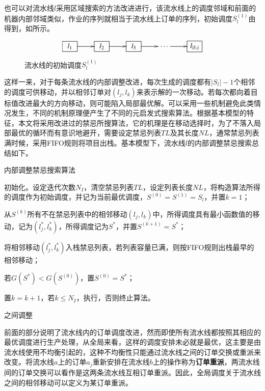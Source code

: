 \begin{asparaenum}
也可以对流水线$l$采用区域搜索的方法改进进行，该流水线上的调度邻域和前面的机器内部邻域类似，作业的序列就相当于流水线上订单的序列，初始调度$S_l^{(1)}$由得到，如所示。
\begin{figure}[h]
\begin{equation*}
\xymatrix{
\jobunit{l_1} \ar[r] & \jobunit{l_2} \ar[r]& \jobunit{l_3} \ar[r]&\cdots\ar[r] &\jobunit{l_{|S_l|}}
}
\end{equation*}
\caption{流水线的初始调度$S_l^{(1)}$\label{fig:initlschedule}}
\end{figure}
这样一来，对于每条流水线的内部调整改进，每次生成的调度都有$|S_l|-1$个相邻的调度可供移动，并以相邻订单对$(l_j, l_k)$来表示解的一次移动。若每次都向着目标值改进最大的方向移动，则可能陷入局部最优解。可以采用一些机制避免此类情况发生，不同的机制原理便产生了不同的元启发式搜索算法。根据基本模型的特征，本文将采用改进过的禁忌所搜算法，它的机理是在移动选择时，为了不落入局部最优的循环而有意识地避开，需要设定禁忌列表$TL$及其长度$NL$，通常禁忌列表满时候，采用FIFO规则将项目出栈。基本模型下，流水线$l$的内部调整禁忌搜索总结如下。
\begin{algori}
内部调整禁忌搜索算法
\begin{asparaenum}
\renewcommand{\labelenumi}{\bf Step\theenumi~}
\item 初始化。设定迭代次数$N_I$，清空禁忌列表$TL$，设定列表长度$NL$，将构造算法所得的调度作为初始调度，并记为当前最优调度，$S^{(0)} = S^{(1)} = S_l$，并置$k = 1$；
\item 从$S^{(k)}$所有不在禁忌列表中的相邻移动$(l_j,l_k)$中，所得调度具有最小函数值的移动，记为$(l_j^*, l_k^*)$，所得调度记为$S^*$，并置$S^{(k+1)} = S^*$；
\item 将相邻移动$(l_j^*, l_k^*)$入栈禁忌列表，若列表容量已满，则按FIFO规则出栈最早的相邻移动；
\item 若$G(S^*) < G(S^{(0)})$，置$S^{(0)} = S^*$；
\item 置$k = k + 1$，若$k\le N_I$，执行，否则终止算法。
\end{asparaenum}
\label{alg:intertabu}
\end{algori}

\item 之间调整

前面的部分说明了流水线内的订单调度改进，然而即使所有流水线都按照其相应的最优调度进行生产处理，从全局来看，这样的调度安排未必就是最优，这主要是由流水线使用不均衡引起的，这种不均衡性只能通过流水线之间的订单交换或重派来改变。将流水线$a$上的订单$a_j$重新安排在流水线$b$上的操作称为\textbf{订单重派}，两流水线间的订单交换可以看作是这两条流水线互相订单重派。因此，全局调度关于流水线之间的相邻移动可以定义为某订单重派。


\end{asparaenum}
